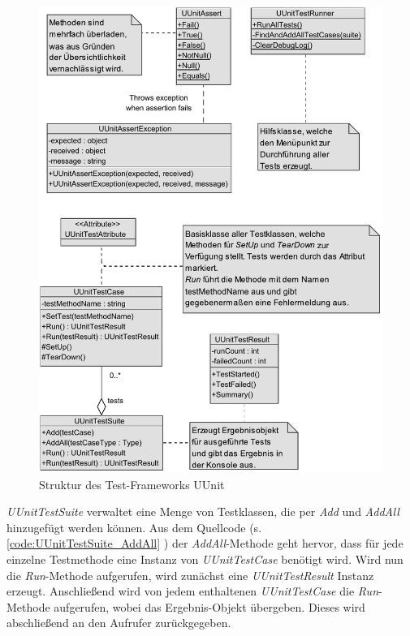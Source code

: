 \clearpage
\begin{figure}
\centering
\includegraphics[width=0.9\linewidth]{images/Kapitel_ErstentwurfDesFrameworks/UUnitStruktur}
\caption[Struktur des Test-Frameworks UUnit]{Struktur des Test-Frameworks UUnit}
\label{fig:UUnitStruktur}
\end{figure}
\clearpage

\textit{UUnitTestSuite} verwaltet eine Menge von Testklassen, die per \textit{Add} und \textit{AddAll} hinzugefügt werden können. Aus dem Quellcode (s. \autoref{code:UUnitTestSuite_AddAll} ) der \textit{AddAll}-Methode geht hervor, dass für jede einzelne Testmethode eine Instanz von \textit{UUnitTestCase} benötigt wird. Wird nun die \textit{Run}-Methode aufgerufen, wird zunächst eine \textit{UUnitTestResult} Instanz erzeugt. Anschließend wird von jedem enthaltenen \textit{UUnitTestCase} die \textit{Run}-Methode aufgerufen, wobei das Ergebnis-Objekt übergeben. Dieses wird abschließend an den Aufrufer zurückgegeben.

